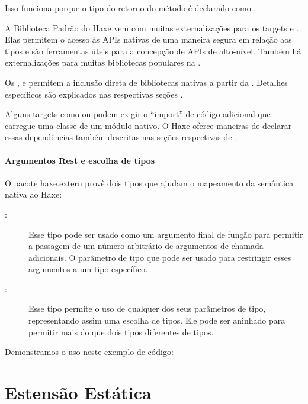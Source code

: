 
Isso funciona porque o tipo do retorno do método  é declarado como . 

A Biblioteca Padrão do Haxe vem com muitas externalizações para os targets  e . Elas permitem o acesso às APIs nativas de uma maneira segura em relação aos tipos e são ferramentas úteis para a concepção de APIs de alto-nível. Também há externalizações para muitas bibliotecas populares na .

Os ,  e  permitem a inclusão direta de bibliotecas nativas a partir da . Detalhes específicos são explicados nas respectivas seções .

Alguns targets como  ou  podem exigir o ``import'' de código adicional que carregue uma classe  de um módulo nativo. O Haxe oferce maneiras de declarar essas dependências também descritas nas seções respectivas de .

\paragraph{Argumentos Rest e escolha de tipos}

O pacote haxe.extern provê dois tipos que ajudam o mapeamento da semântica nativa ao Haxe:

\begin{description}
	\item[:] Esse tipo pode ser usado como um argumento final de função para permitir a passagem de um número arbitrário de argumentos de chamada adicionais. O parâmetro de tipo que pode ser usado para restringir esses argumentos a um tipo específico.
	\item[:] Esse tipo permite o uso de qualquer dos seus parâmetros de tipo, representando assim uma escolha de tipos. Ele pode ser aninhado para permitir mais do que dois tipos diferentes de tipos.
\end{description}

Demonstramos o uso neste exemplo de código:


\section{Estensão Estática}
\label{lf-static-extension}


